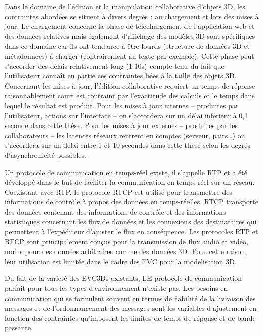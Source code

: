 Dans le domaine de l'édition et la manipulation collaborative 
d'objets 3D, les contraintes abordées se situent à divers degrés : au chargement 
et lors des mises à jour. Le chargement concerne la phase de téléchargement de 
l'application web et des données relatives mais également d'affichage des 
modèles 3D sont spécifiques dans ce domaine car ils ont 
tendance à être lourds (structure de données 3D et métadonnées) à charger 
(contrairement au texte par exemple). Cette phase peut s'accorder des délais 
relativement long (1-10s) compte tenu du fait que l'utilisateur connaît en partie ces 
contraintes liées à la taille des objets 3D. Concernant les mises à jour, l'édition 
collaborative requiert un temps de réponse raisonnablement court est contraint par 
l'exactitude des calculs et le temps dans lequel le résultat est produit. Pour les 
mises à jour internes -- produites par l'utilisateur, actions sur l'interface -- on 
s'accordera sur un délai inférieur à 0,1 seconde dans cette thèse. 
Pour les mises à jour externes -- produites par les collaborateurs -- les latences 
réseaux rentrent en comptes (serveur, pairs\ldots) on s'accordera sur un délai 
entre 1 et 10 secondes dans cette thèse selon les degrés d'asynchronicité 
possibles. 

Un protocole de communication en temps-réel existe, il s'appelle \gls{RTP} et a 
été développé dans le but de faciliter la communication en temps-réel sur un 
réseau. Coexistant avec \gls{RTP}, le protocole \gls{RTCP} est utilisé pour 
transmettre des informations de contrôle à propos des données en temps-réelles. 
\gls{RTCP} transporte des données contenant des informations de contrôle et des 
informations statistiques concernant les flux de données et les connexions des 
destinataires qui permettent à l'expéditeur d'ajuster le flux en conséquence. Les 
protocoles \gls{RTP} et \gls{RTCP} sont principalement conçus pour la 
transmission de flux audio et vidéo, moins pour des données arbitraires comme 
des données 3D. Pour cette raison, leur utilisation est limitée dans le cadre des 
\gls{EVC} pour la modélisation 3D. 

Du fait de la variété des \glspl{EVC3D} existants, LE 
protocole de communication parfait pour tous les types d'environnement n'existe 
pas. 
Les besoins en communication qui se formulent souvent en termes de 
fiabilité de la livraison des messages et de l'ordonnancement des messages sont 
les variables d'ajustement en fonction des contraintes qu'imposent les limites de 
temps de réponse et de bande passante.

